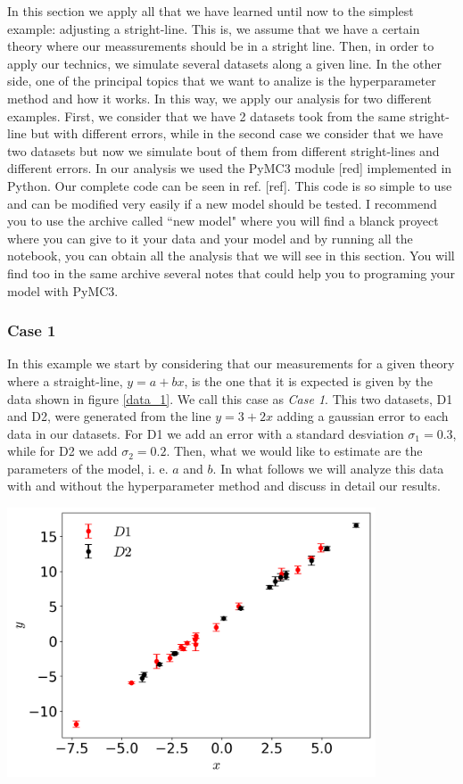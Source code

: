 \documentclass[onecolumn,           %
               showpacs,            %
               preprintnumbers,     %
               aps,                 %
               prl,          	    %
               letterpaper,             %
               superscriptaddress,      %
               nofootinbib,         %
               tightenlines,        %
               floats,floatfix      %
               ,usenatbib,
               ]{revtex4-1}
\begin{document}
In this section we apply all that we have learned until now to the simplest example: adjusting a stright-line. This is, we assume that we have a certain theory where our meassurements should be in a stright line. Then, in order to apply our technics, we simulate several datasets along a given line. In the other side, one of the principal topics that we want to analize is the hyperparameter method and how it works. In this way, we apply our analysis for two different examples. First, we consider that we have 2 datasets took from the same stright-line but with different errors, while in the second case we consider that we have two datasets but now we simulate bout of them from different stright-lines and different errors. In our analysis we used the PyMC3 module [red] implemented in Python. Our complete code can be seen in ref. [ref]. This code is so simple to use and can be modified very easily if a new model should be tested. I recommend you to use the archive called ``new model" where you will find a blanck proyect where you can give to it your data and your model and by running all the notebook, you can obtain all the analysis that we will see in this section. You will find too in the same archive several notes that could help you to programing your model with PyMC3. 

\subsubsection{Case 1}

In this example we start by considering that our measurements for a given theory where a straight-line, $y=a+bx$, is the one that it is expected is given by the data shown in figure \ref{data_1}. We call this case as \textit{Case 1}. This two datasets, D1 and D2, were generated from the line $y=3+2x$ adding a gaussian error to each data in our datasets. For D1 we add an error with a standard desviation $\sigma_1 = 0.3$, while for D2 we add $\sigma_2 = 0.2$. Then, what we would like to estimate are the parameters of the model, i. e. $a$ and $b$. In what follows we will analyze this data with and without the hyperparameter method and discuss in detail our results.

\begin{minipage}{\textwidth}
\centering
\includegraphics[height=8cm]{Figures/data_1.png}
\label{data_1}
\end{minipage}
\end{document}

